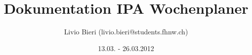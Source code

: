 \usepackage[automark]{scrpage2}
\usepackage[english]{babel}
\usepackage[english]{translator}
\usepackage{tocbasic}
\usepackage[utf8]{inputenc}
\usepackage{lmodern}
\usepackage[T1]{fontenc}
\usepackage{hyphenat}
\usepackage{ae}

\usepackage{boxedminipage}
\usepackage[onehalfspacing]{setspace}

\usepackage{minitoc}
\usepackage{longtable}
\usepackage{listings}
\usepackage[printonlyused]{acronym}

\usepackage{booktabs}
\renewcommand{\arraystretch}{1.4}

\usepackage{ifpdf}
\usepackage{eurosym}
\usepackage{natbib}
\usepackage{paralist}
\usepackage{array,ragged2e}
\usepackage{tabularx}

\usepackage[normalem]{ulem} %

\ifpdf
    \usepackage[pdftex]{graphicx}
\else
    \usepackage{graphicx}
\fi

\pagestyle{scrheadings}
\clearscrheadfoot
{}

\lohead{\sffamily\upshape\headmark}
\lofoot{}
\cofoot[\pagemark]{\pagemark}




\title{Dokumentation IPA Wochenplaner}

\author{Livio Bieri (livio.bieri@students.fhnw.ch)}

\date{13.03. - 26.03.2012}

